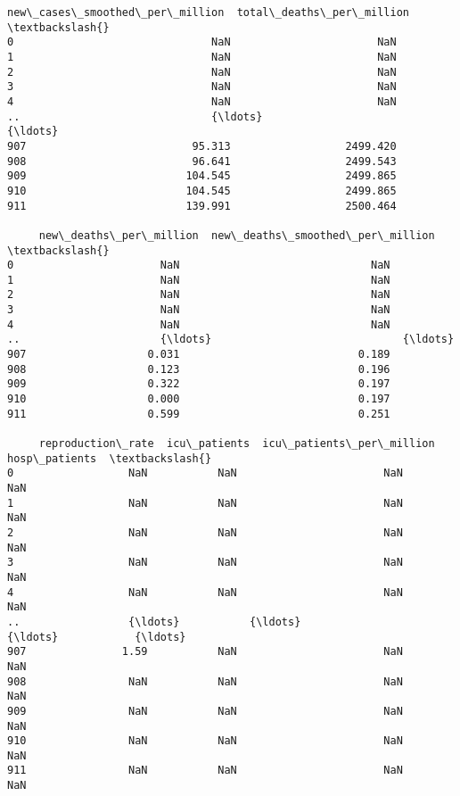 \documentclass[11pt]{article}
\begin{document}
\begin{tcolorbox}[breakable, size=fbox, boxrule=.5pt, pad at break*=1mm, opacityfill=0]
\begin{Verbatim}[commandchars=\\\{\}]
     new\_cases\_smoothed\_per\_million  total\_deaths\_per\_million  \textbackslash{}
0                               NaN                       NaN
1                               NaN                       NaN
2                               NaN                       NaN
3                               NaN                       NaN
4                               NaN                       NaN
..                              {\ldots}                       {\ldots}
907                          95.313                  2499.420
908                          96.641                  2499.543
909                         104.545                  2499.865
910                         104.545                  2499.865
911                         139.991                  2500.464

     new\_deaths\_per\_million  new\_deaths\_smoothed\_per\_million  \textbackslash{}
0                       NaN                              NaN
1                       NaN                              NaN
2                       NaN                              NaN
3                       NaN                              NaN
4                       NaN                              NaN
..                      {\ldots}                              {\ldots}
907                   0.031                            0.189
908                   0.123                            0.196
909                   0.322                            0.197
910                   0.000                            0.197
911                   0.599                            0.251

     reproduction\_rate  icu\_patients  icu\_patients\_per\_million  hosp\_patients  \textbackslash{}
0                  NaN           NaN                       NaN            NaN
1                  NaN           NaN                       NaN            NaN
2                  NaN           NaN                       NaN            NaN
3                  NaN           NaN                       NaN            NaN
4                  NaN           NaN                       NaN            NaN
..                 {\ldots}           {\ldots}                       {\ldots}            {\ldots}
907               1.59           NaN                       NaN            NaN
908                NaN           NaN                       NaN            NaN
909                NaN           NaN                       NaN            NaN
910                NaN           NaN                       NaN            NaN
911                NaN           NaN                       NaN            NaN


\end{Verbatim}
\end{tcolorbox}
\end{document}
